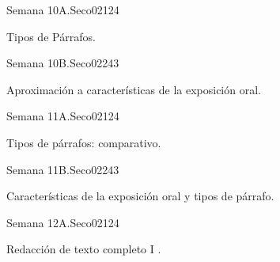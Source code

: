 \begin{syllabus}
\begin{unit}{Semana 10A.}{Seco02}{12}{4}
   \begin{topics}
      \item Tipos de Párrafos.
   \end{topics}
   \begin{learningoutcomes}
      \item 
   \end{learningoutcomes}
\end{unit}

\begin{unit}{Semana 10B.}{Seco02}{24}{3}
   \begin{topics}
      \item Aproximación a características de la exposición oral.
   \end{topics}

   \begin{learningoutcomes}
      \item 
      \item
      \item 
      \end{learningoutcomes}
\end{unit}


\begin{unit}{Semana 11A.}{Seco02}{12}{4}
   \begin{topics}
      \item Tipos de párrafos: comparativo.
   \end{topics}
   \begin{learningoutcomes}
      \item 
   \end{learningoutcomes}
\end{unit}

\begin{unit}{Semana 11B.}{Seco02}{24}{3}
   \begin{topics}
      \item Características de la exposición oral y tipos de párrafo.
   \end{topics}

   \begin{learningoutcomes}
      \item 
      \item
      \item 
      \end{learningoutcomes}
\end{unit}


\begin{unit}{Semana 12A.}{Seco02}{12}{4}
   \begin{topics}
      \item Redacción de texto completo I .
   \end{topics}
   \begin{learningoutcomes}
      \item 
   \end{learningoutcomes}
\end{unit}


\end{syllabus}
